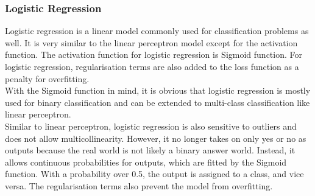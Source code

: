 \documentclass[10pt, a4paper, twocolumn]{article} %
\begin{document}
\subsubsection{Logistic Regression}
Logistic regression\citep{Arun}\citep{Mazen}\citep{Tanvi} is a linear model commonly used for classification problems as well. It is very similar to the 
linear perceptron model except for the activation function. The activation function for logistic regression is Sigmoid function. 
For logistic regression, regularisation terms are also added to the loss function as a penalty for overfitting.\\[10pt]
With the Sigmoid function in mind, it is obvious that logistic regression is mostly used for binary classification and can 
be extended to multi-class classification like linear perceptron.\\[10pt]
Similar to linear perceptron, logistic regression is also sensitive to outliers and does not allow multicollinearity. However, it 
no longer takes on only yes or no as outputs because the real world is not likely a binary answer world. Instead, it allows 
continuous probabilities for outputs, which are fitted by the Sigmoid function. With a probability over 0.5, the output is 
assigned to a class, and vice versa. The regularisation 
terms also prevent the model from overfitting\citep{Geek}.
\end{document}
